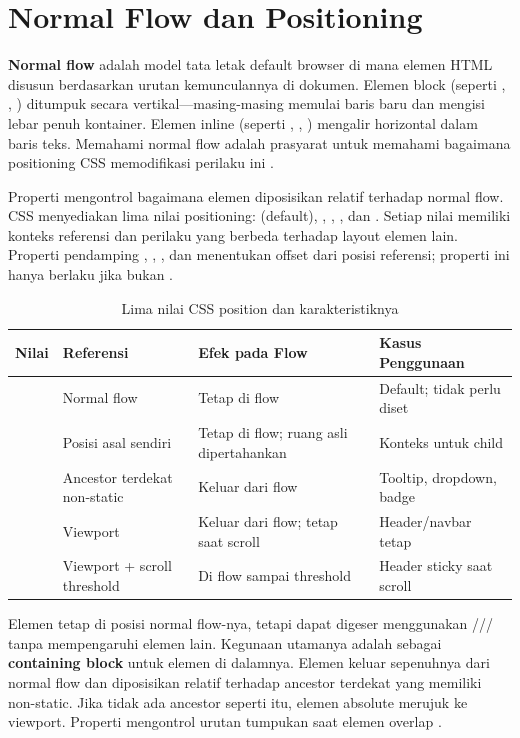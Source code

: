 ﻿\section{Normal Flow dan Positioning}

\textbf{Normal flow} adalah model tata letak default browser di mana elemen HTML disusun berdasarkan urutan kemunculannya di dokumen. Elemen block (seperti , , ) ditumpuk secara vertikal---masing-masing memulai baris baru dan mengisi lebar penuh kontainer. Elemen inline (seperti , , ) mengalir horizontal dalam baris teks. Memahami normal flow adalah prasyarat untuk memahami bagaimana positioning CSS memodifikasi perilaku ini \cite{mdnCss}.

Properti  mengontrol bagaimana elemen diposisikan relatif terhadap normal flow. CSS menyediakan lima nilai positioning:  (default), , , , dan . Setiap nilai memiliki konteks referensi dan perilaku yang berbeda terhadap layout elemen lain. Properti pendamping , , , dan  menentukan offset dari posisi referensi; properti ini hanya berlaku jika  bukan  \cite{webdevCss}.

\begin{table}[H]
\centering
\begin{tabular}{|P{2cm}|P{3cm}|P{3.5cm}|P{3.5cm}|}
\hline
\textbf{Nilai} & \textbf{Referensi} & \textbf{Efek pada Flow} & \textbf{Kasus Penggunaan} \\
\hline
{} & Normal flow & Tetap di flow & Default; tidak perlu diset \\
\hline
{} & Posisi asal sendiri & Tetap di flow; ruang asli dipertahankan & Konteks untuk  child \\
\hline
{} & Ancestor terdekat non-static & Keluar dari flow & Tooltip, dropdown, badge \\
\hline
{} & Viewport & Keluar dari flow; tetap saat scroll & Header/navbar tetap \\
\hline
{} & Viewport + scroll threshold & Di flow sampai threshold & Header sticky saat scroll \\
\hline
\end{tabular}
\caption{Lima nilai CSS position dan karakteristiknya}
\end{table}

Elemen  tetap di posisi normal flow-nya, tetapi dapat digeser menggunakan /// tanpa mempengaruhi elemen lain. Kegunaan utamanya adalah sebagai \textbf{containing block} untuk elemen  di dalamnya. Elemen  keluar sepenuhnya dari normal flow dan diposisikan relatif terhadap ancestor terdekat yang memiliki  non-static. Jika tidak ada ancestor seperti itu, elemen absolute merujuk ke viewport. Properti  mengontrol urutan tumpukan saat elemen overlap \cite{cssTricks}.


